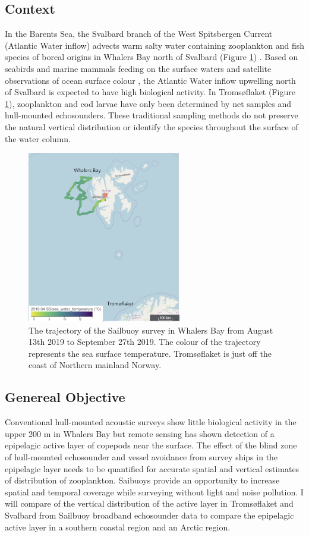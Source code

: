 \documentclass[a4paper, 12pt, Ariel]{article}
\begin{document}
\subsection{Context}
In the Barents Sea, the Svalbard branch of the West Spitsbergen Current (Atlantic Water inflow) advects warm salty water containing zooplankton and fish species of boreal origins in Whalers Bay north of Svalbard (Figure \ref{fig:whalers}) \cite{Falk-Petersen2015}. Based on seabirds and marine mammals feeding on the surface waters and satellite observations of ocean surface colour \cite{Basedow2019}, the Atlantic Water inflow upwelling north of Svalbard is expected to have high biological activity. In Tromsøflaket (Figure \ref{fig:whalers}), zooplankton and cod larvae have only been determined by net samples and hull-mounted echosounders. These traditional sampling methods do not preserve the natural vertical distribution or identify the species throughout the surface of the water column. 


\begin{figure}[H]
	\centering
	\includegraphics[width=0.6\textwidth]{SB2019WhalersBay.png}
	\caption{The trajectory of the Sailbuoy survey in Whalers Bay from August 13th 2019 to September 27th 2019. The colour of the trajectory represents the sea surface temperature. Tromsøflaket is just off the coast of Northern mainland Norway.}
	\label{fig:whalers}
\end{figure}

\subsection{Genereal Objective}
Conventional hull-mounted acoustic surveys show little biological activity in the upper 200 m in Whalers Bay but remote sensing has shown detection of a epipelagic active layer of copepods near the surface. The effect of the blind zone of hull-mounted echosounder and vessel avoidance from survey ships in the epipelagic layer needs to be quantified for accurate spatial and vertical estimates of distribution of zooplankton. Saibuoys provide an opportunity to increase spatial and temporal coverage while surveying without light and noise pollution. I will compare of the vertical distribution of the active layer in Tromsøflaket and Svalbard from Sailbuoy broadband echosounder data to compare the epipelagic active layer in a southern coastal region and an Arctic region.
\end{document}
